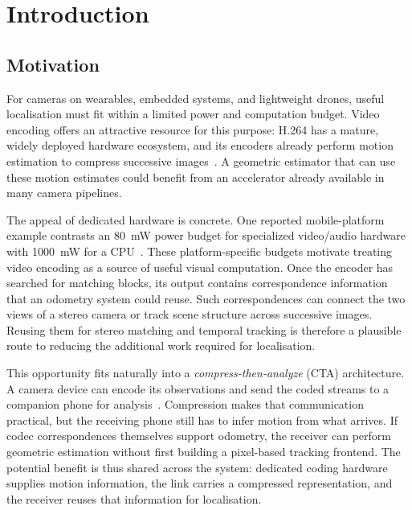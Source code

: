 
\chapter{Introduction}\label{chapter:introduction}

\section{Motivation}

For cameras on wearables, embedded systems, and lightweight drones, useful
localisation must fit within a limited power and computation budget. Video
encoding offers an attractive resource for this purpose: H.264 has a mature,
widely deployed hardware ecosystem, and its encoders already perform motion
estimation to compress successive images~\cite{hilscher2026voca}. A geometric
estimator that can use these motion estimates could benefit from an accelerator
already available in many camera pipelines.

The appeal of dedicated hardware is concrete. One reported mobile-platform
example contrasts an \SI{80}{\milli\watt} power budget for specialized
video/audio hardware with \SI{1000}{\milli\watt} for a
CPU~\cite{chaurasia2020passthrough}.
These platform-specific budgets motivate treating video encoding as a source of
useful visual computation. Once the encoder has searched for matching blocks,
its output contains correspondence information that an odometry system could
reuse. Such correspondences can connect the two views of a stereo camera or
track scene structure across successive images. Reusing them for stereo
matching and temporal tracking is therefore a plausible route to reducing
the additional work required for localisation.

This opportunity fits naturally into a \emph{compress-then-analyze} (CTA)
architecture. A camera device can encode its observations and send the coded
streams to a companion phone for analysis~\cite{hofer2023h264cta,hilscher2026voca}.
Compression makes that communication practical, but the receiving phone still
has to infer motion from what arrives. If codec correspondences themselves
support odometry, the receiver can perform geometric estimation without first
building a pixel-based tracking frontend. The potential benefit is thus shared
across the system: dedicated coding hardware supplies motion information, the
link carries a compressed representation, and the receiver reuses that
information for localisation.

